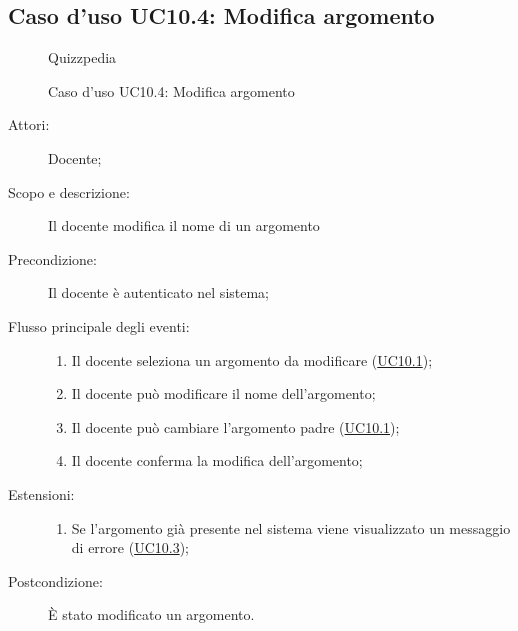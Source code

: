 \subsection{Caso d'uso UC10.4: Modifica argomento}
        \begin{figure}[H]
            \centering
            \begin{resizedtikzpicture}{\textwidth}
		\begin{umlsystem}[x=0, fill=lightgray!20]{Quizzpedia}
		\end{umlsystem}
            \end{resizedtikzpicture}
            \caption{Caso d'uso UC10.4: Modifica argomento}
            \label{fig:UC10.4} 
        \end{figure}
    \begin{description}
\item[Attori:] Docente;
\item[Scopo e descrizione:] Il docente modifica il nome di un argomento
      \item[Precondizione:] Il docente è autenticato nel sistema;

        \item[Flusso principale degli eventi:] \begin{enumerate}
          \item Il docente seleziona un argomento da modificare (\hyperlink{UC10.1}{UC10.1});
          \item Il docente può modificare il nome dell'argomento;
          \item Il docente può cambiare l'argomento padre (\hyperlink{UC10.1}{UC10.1});
          \item Il docente conferma la modifica dell'argomento;

      \end{enumerate}
    \item[Estensioni:]
      \begin{enumerate}
          \item Se l'argomento già presente nel sistema viene visualizzato un messaggio di errore (\hyperlink{UC10.3}{UC10.3});

      \end{enumerate}
    \item[Postcondizione:] È stato modificato un argomento.
  \end{description}
\hypertarget{UC10.5}{}
